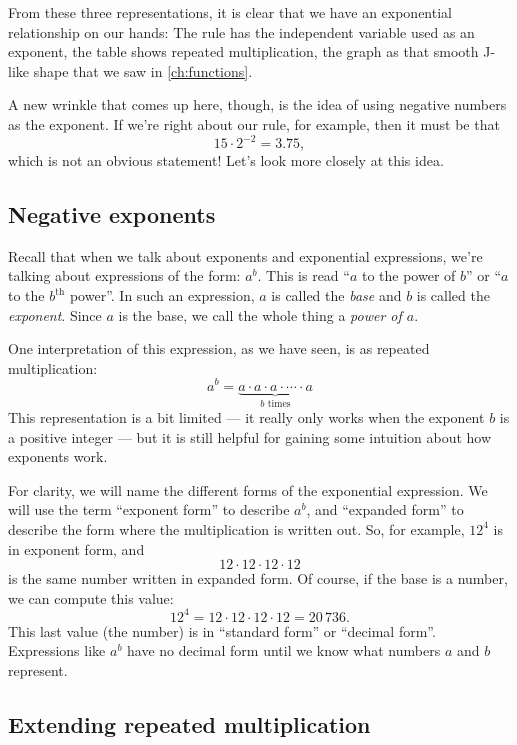 From these three representations, it is clear that we have an exponential relationship on our hands: The rule has the independent variable used as an exponent, the table shows repeated multiplication, the graph as that smooth J-like shape that we saw in \cref{ch:functions}.

A new wrinkle that comes up here, though, is the idea of using negative numbers as the exponent. If we're right about our rule, for example, then it must be that \[15 \cdot 2^{-2} = 3.75,\]
which is not an obvious statement! Let's look more closely at this idea.

\subsection{Negative exponents}
\label{sec:exponegative}

Recall that when we talk about exponents and exponential expressions, we're talking about expressions of the form: $a^b$. This is read ``$a$ to the power of $b$'' or ``$a$ to the $b^{\text{th}}$ power''. In such an expression, $a$ is called the \textit{base} and $b$ is called the \textit{exponent}. Since $a$ is the base, we call the whole thing a \textit{power of $a$}.

One interpretation of this expression, as we have seen, is as repeated multiplication:
\[a^b = \underbrace{a \cdot a \cdot a \cdot \dotsm \cdot a}_{\text{$b$ times}}\]
This representation is a bit limited --- it really only works when the exponent $b$ is a positive integer --- but it is still helpful for gaining some intuition about how exponents work.

For clarity, we will name the different forms of the exponential expression. We will use the term ``exponent form'' to describe $a^b$, and  ``expanded form'' to describe the form where the multiplication is written out. So, for example, $12^4$ is in exponent form, and \[12\cdot12\cdot12\cdot12\] is the same number written in expanded form. Of course, if the base is a number, we can compute this value: \[12^4 = 12\cdot12\cdot12\cdot12 = 20\,736.\] This last value (the number) is in ``standard form'' or ``decimal form''. Expressions like $a^b$ have no decimal form until we know what numbers $a$ and $b$ represent.

\subsection{Extending repeated multiplication}

